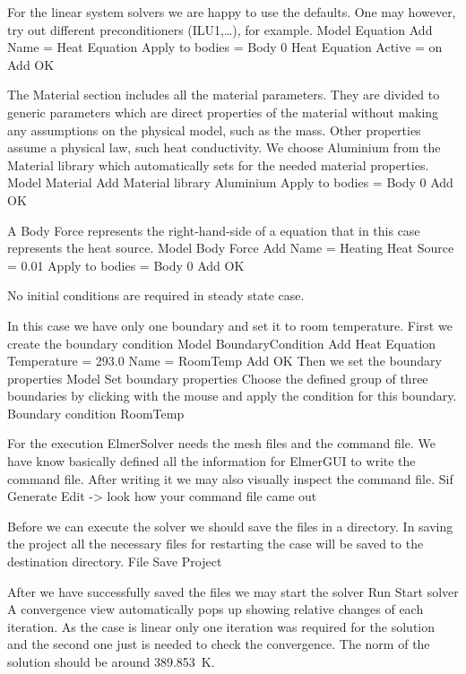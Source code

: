 For the linear system solvers we are happy to use the defaults. One may however, try out different
preconditioners (ILU1,\ldots), for example.
\ttbegin
Model
  Equation
    Add 
      Name = Heat Equation
      Apply to bodies = Body 0
      Heat Equation
        Active = on
      Add   
      OK
\ttend        

The Material section includes all the material parameters.
They are divided to generic parameters which are direct properties of the material
without making any assumptions on the physical model, such as the mass. Other properties assume
a physical law, such heat conductivity.
We choose Aluminium from the Material library which automatically sets for the needed material properties. 
\ttbegin
Model
  Material
    Add 
      Material library
        Aluminium
      Apply to bodies = Body 0 
      Add 
      OK
\ttend

A Body Force represents the right-hand-side of a equation that in this case represents
the heat source. 
\ttbegin
Model
  Body Force
    Add 
      Name = Heating
      Heat Source = 0.01
      Apply to bodies = Body 0
      Add
      OK
\ttend    

No initial conditions are required in steady state case.

In this case we have only one boundary and set it to room temperature.
First we create the boundary condition
\ttbegin
Model
  BoundaryCondition
    Add 
      Heat Equation
        Temperature = 293.0
      Name = RoomTemp
      Add
      OK
\ttend   
Then we set the boundary properties 
\ttbegin
Model 
  Set boundary properties  
\ttend
Choose the defined group of three boundaries by clicking with the mouse
and apply the condition for this boundary.
\ttbegin
Boundary condition
  RoomTemp
\ttend

For the execution 
ElmerSolver needs the mesh files and the command file. We have know basically defined
all the information for ElmerGUI to write the command file. After writing it we may also visually 
inspect the command file.
\ttbegin
Sif 
  Generate
  Edit -> look how your command file came out  
\ttend

Before we can execute the solver we should save the files in a directory. In saving the project all the
necessary files for restarting the case will be saved to the 
destination directory.
\ttbegin
File 
  Save Project
\ttend

After we have successfully saved the files we may start the solver
\ttbegin
Run
  Start solver
\ttend
A convergence view automatically pops up showing relative changes of each iteration.
As the case is linear only one iteration was required for the solution and the second one
just is needed to check the convergence. The norm of the solution
should be around 389.853~K.

